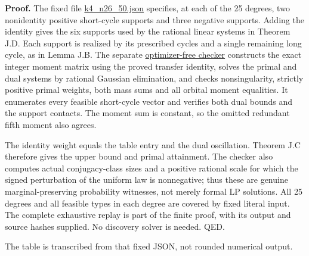 \documentclass[
  11pt,
]{article}
\begin{document}
\textbf{Proof.} The fixed file
\href{../../notes/johnson-short-cycle-spectrum/certificates/k4_n26_50.json}{k4\_n26\_50.json}
specifies, at each of the 25 degrees, two nonidentity positive
short-cycle supports and three negative supports. Adding the identity
gives the six supports used by the rational linear systems in Theorem
J.D. Each support is realized by its prescribed cycles and a single
remaining long cycle, as in Lemma J.B. The separate
\href{../../notes/johnson-short-cycle-spectrum/check_k4_26_50.py}{optimizer-free
checker} constructs the exact integer moment matrix using the proved
transfer identity, solves the primal and dual systems by rational
Gaussian elimination, and checks nonsingularity, strictly positive
primal weights, both mass sums and all orbital moment equalities. It
enumerates every feasible short-cycle vector and verifies both dual
bounds and the support contacts. The moment sum is constant, so the
omitted redundant fifth moment also agrees.

The identity weight equals the table entry and the dual oscillation.
Theorem J.C therefore gives the upper bound and primal attainment. The
checker also computes actual conjugacy-class sizes and a positive
rational scale for which the signed perturbation of the uniform law is
nonnegative; thus these are genuine marginal-preserving probability
witnesses, not merely formal LP solutions. All 25 degrees and all
feasible types in each degree are covered by fixed literal input. The
complete exhaustive replay is part of the finite proof, with its output
and source hashes supplied. No discovery solver is needed. QED.

The table is transcribed from that fixed JSON, not rounded numerical
output.
\end{document}
